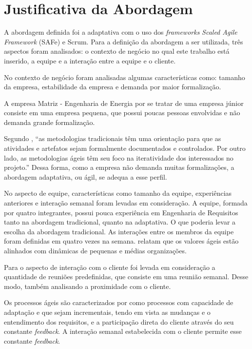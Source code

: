 \chapter[Justificativa]{Justificativa da Abordagem}

A abordagem definida foi a adaptativa com o uso dos \textit{frameworks} \emph{Scaled Agile Framework} (SAFe) e Scrum. 
Para a definição da abordagem a ser utilizada, 
três aspectos foram analisados: o contexto de negócio no qual este trabalho está inserido,
a equipe e a interação entre a equipe e o cliente.

No contexto de negócio foram analisadas algumas características como: tamanho da empresa,
estabilidade da empresa e demanda por maior formalização.

A empresa Matriz - Engenharia de Energia por se tratar de uma empresa júnior consiste
em uma empresa pequena, que possui poucas pessoas envolvidas e não demanda grande formalização.

Segundo , ``as metodologias tradicionais têm uma orientação
para que as atividades e artefatos sejam formalmente documentados e controlados. Por outro lado, as metodologias ágeis têm seu foco
na iteratividade dos interessados no projeto.'' Dessa forma, como a empresa não demanda muitas formalizações, a abordagem adaptativa, ou ágil,
se adequa a esse perfil.

No aspecto de equipe, características como tamanho da equipe, experiências anteriores e interação semanal 
foram levadas em consideração. A equipe, formada por quatro integrantes, possui pouca experiência 
em Engenharia de Requisitos tanto na abordagem tradicional, quanto na adaptativa. O que poderia
levar a escolha da abordagem tradicional.
As interações entre os membros da equipe foram definidas em quatro vezes na semana.
 relatam que os valores ágeis estão alinhados com dinâmicas de pequenas e médias organizações.

Para o aspecto de interação com o cliente foi levada em consideração a quantidade de
reuniões predefinidas, que consiste em uma reunião semanal. Desse modo, também analisando 
a proximidade com o cliente.

Os processos ágeis são caracterizados por  como processos
com capacidade de adaptação e que sejam incrementais, tendo em vista as
mudanças e o entendimento dos requisitos, e a participação direta do cliente através
do seu constante \textit{feedback}. A interação semanal estabelecida com o cliente permite esse constante
\textit{feedback}.


